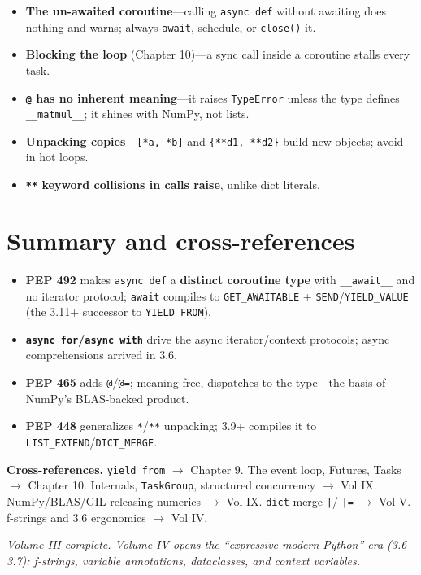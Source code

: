 \begin{itemize}
  \item \textbf{The un-awaited coroutine}---calling \texttt{async def} without awaiting does
    nothing and warns; always \texttt{await}, schedule, or \texttt{close()} it.
  \item \textbf{Blocking the loop} (Chapter 10)---a sync call inside a coroutine stalls every task.
  \item \textbf{\texttt{@} has no inherent meaning}---it raises \texttt{TypeError} unless the type
    defines \texttt{\_\_matmul\_\_}; it shines with NumPy, not lists.
  \item \textbf{Unpacking copies}---\texttt{[*a, *b]} and \texttt{\{**d1, **d2\}} build new
    objects; avoid in hot loops.
  \item \textbf{\texttt{**} keyword collisions in calls raise}, unlike dict literals.
\end{itemize}

\section{Summary and cross-references}

\begin{itemize}
  \item \textbf{PEP 492} makes \texttt{async def} a \textbf{distinct coroutine type} with
    \texttt{\_\_await\_\_} and no iterator protocol; \texttt{await} compiles to
    \texttt{GET\_AWAITABLE} + \texttt{SEND}/\texttt{YIELD\_VALUE} (the 3.11+ successor to
    \texttt{YIELD\_FROM}).
  \item \textbf{\texttt{async for}/\texttt{async with}} drive the async iterator/context protocols;
    async comprehensions arrived in 3.6.
  \item \textbf{PEP 465} adds \texttt{@}/\texttt{@=}; meaning-free, dispatches to the type---the
    basis of NumPy's BLAS-backed product.
  \item \textbf{PEP 448} generalizes \texttt{*}/\texttt{**} unpacking; 3.9+ compiles it to
    \texttt{LIST\_EXTEND}/\texttt{DICT\_MERGE}.
\end{itemize}

\textbf{Cross-references.} \texttt{yield from} $\rightarrow$ Chapter 9. The event loop, Futures,
Tasks $\rightarrow$ Chapter 10. Internals, \texttt{TaskGroup}, structured concurrency $\rightarrow$
Vol IX. NumPy/BLAS/GIL-releasing numerics $\rightarrow$ Vol IX. \texttt{dict} merge \texttt{|}/
\texttt{|=} $\rightarrow$ Vol V. f-strings and 3.6 ergonomics $\rightarrow$ Vol IV.

\bigskip
\noindent\emph{Volume III complete. Volume IV opens the ``expressive modern Python'' era
(3.6--3.7): f-strings, variable annotations, dataclasses, and context variables.}
